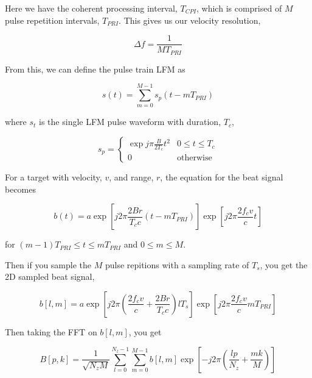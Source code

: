 \documentclass[preview]{standalone}
\begin{document}
\begin{center}
Here we have the coherent processing interval, $T_{CPI}$, which is comprised of $M$ pulse repetition intervals, $T_{PRI}$. This gives us our velocity resolution, 

\begin{equation}
    \Delta f = \frac{1}{M T_{PRI}}
\end{equation}

From this, we can define the pulse train LFM as

\begin{equation}
    s(t) = \sum_{m=0}^{M-1} s_p(t - m T_{PRI})
\end{equation}

where $s_t$ is the single LFM pulse waveform with duration, $T_c$,

\begin{equation}
    s_p = \begin{cases} 
      \exp{j \pi \frac{B}{2 T_c} t^2} & 0 \le t \le T_c \\
      0 & \text{otherwise}
   \end{cases}
\end{equation}

For a target with velocity, $v$, and range, $r$, the equation for the beat signal becomes

\begin{equation}
    b(t) = a \exp{\left[ j 2 \pi \frac{2 B r}{T_c c} (t - m T_{PRI}) \right]} \exp{\left[ j 2 \pi \frac{2 f_c v}{c} t \right]}
\end{equation}

for $(m-1) T_{PRI} \le t \le m T_{PRI}$ and $0 \le m \le M$.

Then if you sample the $M$ pulse repitions with a sampling rate of $T_s$, you get the 2D sampled beat signal,

\begin{equation}
    b[l, m] = a \exp{\left[ j 2 \pi \left( \frac{2 f_c v}{c} + \frac{2 B r}{T_c c} \right) l T_s \right]} \exp{\left[ j 2 \pi \frac{2 f_c v}{c} m T_{PRI} \right]}
\end{equation}

Then taking the FFT on $b[l, m]$, you get

\begin{equation}
    B[p, k] = \frac{1}{\sqrt{N_z M}} \sum_{l=0}^{N_z-1} \sum_{m=0}^{M-1} b[l, m] \exp{\left[ -j 2 \pi \left( \frac{lp}{N_z} + \frac{mk}{M} \right) \right]}
\end{equation}
\end{center}
\end{document}
